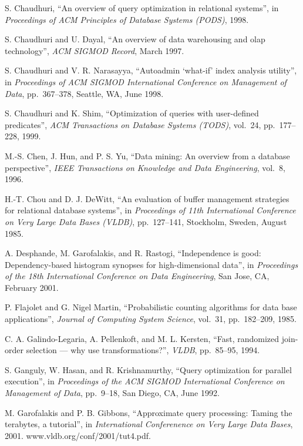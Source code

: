 \documentclass[a4paper,11pt,twoside,openright]{book}
\begin{document}
\begin{enumerate}[label={[\arabic*]}]
  S. Chaudhuri, ``An overview of query optimization in relational
  systems'', in \emph{Proceedings of ACM Principles of Database Systems (PODS)}, 1998.
\item
  S. Chaudhuri and U. Dayal, ``An overview of data warehousing and olap
  technology'', \emph{ACM SIGMOD Record}, March 1997.
\item
  S. Chaudhuri and V. R. Narasayya, ``Autoadmin `what-if' index analysis
  utility'', in \emph{Proceedings of ACM SIGMOD International Conference
  on Management of Data}, pp.~367--378, Seattle, WA, June 1998.
\item
  S. Chaudhuri and K. Shim, ``Optimization of queries with user-defined
  predicates'', \emph{ACM Transactions on Database Systems (TODS)},
  vol.~24, pp.~177--228, 1999.
\item
  M.-S. Chen, J. Hun, and P. S. Yu, ``Data mining: An overview from a
  database perspective'', \emph{IEEE Transactions on Knowledge and Data
  Engineering}, vol.~8, 1996.
\item
  H.-T. Chou and D. J. DeWitt, ``An evaluation of buffer management
  strategies for relational database systems'', in \emph{Proceedings of
  11th International Conference on Very Large Data Bases (VLDB)},
  pp.~127--141, Stockholm, Sweden, August 1985.
\item
  A. Desphande, M. Garofalakis, and R. Rastogi, ``Independence is good:
  Dependency-based histogram synopses for high-dimensional data'', in
  \emph{Proceedings of the 18th International Conference on Data
  Engineering}, San Jose, CA, February 2001.
\item
  P. Flajolet and G. Nigel Martin, ``Probabilistic counting algorithms
  for data base applications'', \emph{Journal of Computing System
  Science}, vol.~31, pp.~182--209, 1985.
\item
  C. A. Galindo-Legaria, A. Pellenkoft, and M. L. Kersten, ``Fast,
  randomized join-order selection --- why use transformations?'',
  \emph{VLDB}, pp.~85--95, 1994.
\item
  S. Ganguly, W. Hasan, and R. Krishnamurthy, ``Query optimization for
  parallel execution'', in \emph{Proceedings of the ACM SIGMOD
  International Conference on} \emph{Management of Data}, pp.~9--18, San
  Diego, CA, June 1992.
\item
  M. Garofalakis and P. B. Gibbons, ``Approximate query processing:
  Taming the terabytes, a tutorial'', in \emph{International
  Conferenence on Very Large Data} \emph{Bases}, 2001.
  www.vldb.org/conf/2001/tut4.pdf.
\item

\end{enumerate}
\end{document}
